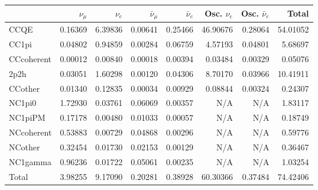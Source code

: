 \begin{tabular} { | l ||r | r | r | r | r | r | | r | }
\hline
              & $\nu_\mu$            & $\nu_e$              & $\bar{\nu}_{\mu}$    & $\bar{\nu}_{e}$      & Osc. $\nu_e$         & Osc. $\bar{\nu}_{e}$ & Total                \\ \hline\hline
 CCQE         & 0.16369              & 6.39836              & 0.00641              & 0.25466              & 46.90676             & 0.28064              & 54.01052             \\ \hline
 CC1pi        & 0.04802              & 0.94859              & 0.00284              & 0.06759              & 4.57193              & 0.04801              & 5.68697              \\ \hline
 CCcoherent   & 0.00012              & 0.00840              & 0.00018              & 0.00394              & 0.03484              & 0.00329              & 0.05076              \\ \hline
 2p2h         & 0.03051              & 1.60298              & 0.00120              & 0.04306              & 8.70170              & 0.03966              & 10.41911             \\ \hline
 CCother      & 0.01340              & 0.12835              & 0.00034              & 0.00929              & 0.08844              & 0.00324              & 0.24307              \\ \hline
 NC1pi0       & 1.72930              & 0.03761              & 0.06069              & 0.00357              & N/A                  & N/A                  & 1.83117              \\ \hline
 NC1piPM      & 0.17178              & 0.00480              & 0.01033              & 0.00057              & N/A                  & N/A                  & 0.18749              \\ \hline
 NCcoherent   & 0.53883              & 0.00729              & 0.04868              & 0.00296              & N/A                  & N/A                  & 0.59776              \\ \hline
 NCother      & 0.32454              & 0.01730              & 0.02153              & 0.00129              & N/A                  & N/A                  & 0.36467              \\ \hline
 NC1gamma     & 0.96236              & 0.01722              & 0.05061              & 0.00235              & N/A                  & N/A                  & 1.03254              \\ \hline
\hline
 Total        & 3.98255              & 9.17090              & 0.20281              & 0.38928              & 60.30366             & 0.37484              & 74.42406             \\ \hline

\end{tabular}
